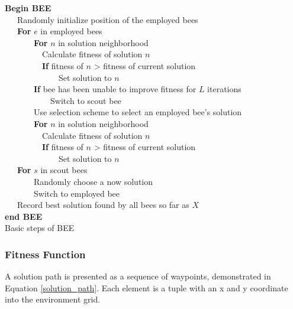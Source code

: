 \documentclass{tamuccthesis}
\begin{document}
\begin{algorithm}%
\textbf{Begin BEE}\\
~~~Randomly initialize position of the employed bees \\
~~~\textbf{For} $e$ in employed bees \\
~~~~~~~\textbf{For} $n$ in solution neighborhood \\
~~~~~~~~~Calculate fitness of solution $n$ \\
~~~~~~~~~\textbf{If} fitness of $n$ > fitness of current solution \\
~~~~~~~~~~~~~Set solution to $n$ \\
~~~~~~~\textbf{If} bee has been unable to improve fitness for $L$ iterations \\
~~~~~~~~~~~Switch to scout bee \\
~~~~~~~Use selection scheme to select an employed bee's solution \\
~~~~~~~\textbf{For} $n$ in solution neighborhood \\
~~~~~~~~~Calculate fitness of solution $n$ \\
~~~~~~~~~\textbf{If} fitness of $n$ > fitness of current solution \\
~~~~~~~~~~~~~Set solution to $n$ \\
~~~\textbf{For} $s$ in scout bees \\
~~~~~~~Randomly choose a now solution \\
~~~~~~~Switch to employed bee \\
~~~Record best solution found by all bees so far as $X$ \\
\textbf{end BEE}\\
\caption{Basic steps of BEE} 
\label{BEE}
\end{algorithm}

\subsubsection{Fitness Function}
\label{section:fitness_function}

A solution path is presented as a sequence of waypoints, demonstrated in Equation \ref{solution_path}. Each element is a tuple with an x and y coordinate into the environment grid. 
\end{document}
